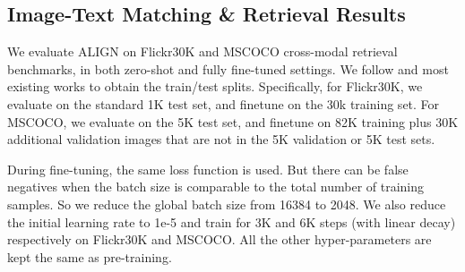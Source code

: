\documentclass{article}
\begin{document}
\begin{table}[t]
\centering
\small
\caption{Spearman's R Bootstrap Correlation () on Crisscrossed Captions~(CxC) dataset. ALIGN is compared with VSE++~\cite{faghri:vse++}, VSRN~\cite{li:vsrn}, DE\textsubscript{I2T}~\cite{parekh:cxc}, and DE\textsubscript{T2T+I2T}~\cite{parekh:cxc}.}
\label{tab:cxc_spearman_corr}
\vspace{2mm}
\vspace{-5mm}
\end{table}

\vspace{-2mm}
\subsection{Image-Text Matching \& Retrieval Results}

We evaluate ALIGN on Flickr30K and MSCOCO cross-modal retrieval benchmarks, in both zero-shot and fully fine-tuned settings. We follow \cite{karpathy:image-text2015} and most existing works to obtain the train/test splits. Specifically, for Flickr30K, we evaluate on the standard 1K test set, and finetune on the 30k training set. For MSCOCO, we evaluate on the 5K test set, and finetune on 82K training plus 30K additional validation images that are not in the 5K validation or 5K test sets.

During fine-tuning, the same loss function is used. But there can be false negatives when the batch size is comparable to the total number of training samples. So we reduce the global batch size from 16384 to 2048. We also reduce the initial learning rate to 1e-5 and train for 3K and 6K steps (with linear decay) respectively on Flickr30K and MSCOCO. All the other hyper-parameters are kept the same as pre-training.
\end{document}
